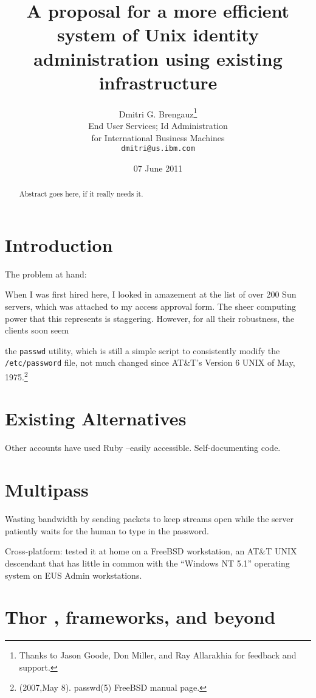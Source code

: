 \documentclass[12pt]{article}
\title{A proposal for a more efficient system of Unix identity
  administration using existing infrastructure}
\author{Dmitri G. Brengauz\thanks{Thanks to Jason Goode, Don Miller,
    and Ray Allarakhia for feedback and support.}\\
\small End User Services; Id Administration\\
\small for International Business Machines \\
\small \texttt{dmitri@us.ibm.com}\\
}
\date{07 June 2011}
\begin{document}
\maketitle

\begin{abstract}

Abstract goes here, if it really needs it.

\end{abstract}

\section{Introduction}

The problem at hand:

When I was first hired here, I looked in amazement at the list of over
200 Sun servers, which was attached to my access approval form.  The
sheer computing power that this represents is staggering.  However,
for all their robustness, the clients soon seem 

the \texttt{passwd} utility, which is still a simple script to
consistently modify the \texttt{/etc/password} file, not much changed
since AT\&T's Version 6 UNIX of May, 1975.\footnote{ (2007,May
  8). passwd(5) FreeBSD manual page.}




\section{Existing Alternatives}

Other accounts have used 
Ruby --easily accessible.  Self-documenting code.



\section{Multipass}

Wasting bandwidth by sending packets to keep streams open while the
server patiently waits for the human to type in the password.   


Cross-platform:  tested it at home on a FreeBSD workstation, an  AT\&T
UNIX descendant that has little in common with the ``Windows NT 5.1''
operating system on EUS Admin workstations.


\section{Thor , frameworks, and beyond}
\end{document}
